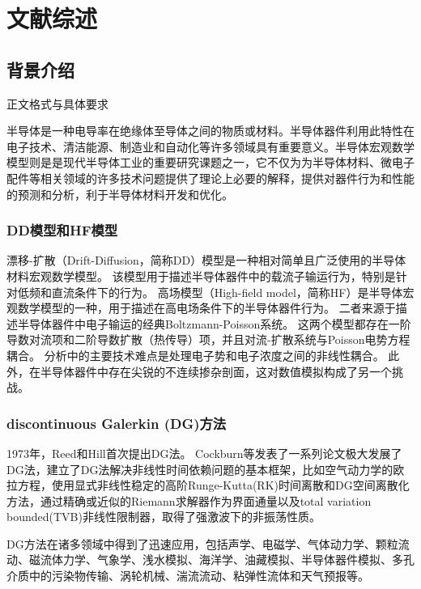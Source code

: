 \cleardoublepage
\newrefsection
\chapter{文献综述}

\section{背景介绍}
\par 正文格式与具体要求\cite{zjuthesisrules}

半导体是一种电导率在绝缘体至导体之间的物质或材料。半导体器件利用此特性在电子技术、清洁能源、制造业和自动化等许多领域具有重要意义。半导体宏观数学模型则是是现代半导体工业的重要研究课题之一，它不仅为为半导体材料、微电子配件等相关领域的许多技术问题提供了理论上必要的解释，提供对器件行为和性能的预测和分析，利于半导体材料开发和优化。
\subsection{DD模型\cite{cercignani2000device}和HF模型\cite{cercignani2000device}}
漂移-扩散（Drift-Diffusion，简称DD）模型是一种相对简单且广泛使用的半导体材料宏观数学模型。
该模型用于描述半导体器件中的载流子输运行为，特别是针对低频和直流条件下的行为。
高场模型（High-field model，简称HF）是半导体宏观数学模型的一种，用于描述在高电场条件下的半导体器件行为。
二者来源于描述半导体器件中电子输运的经典Boltzmann-Poisson系统。
这两个模型都存在一阶导数对流项和二阶导数扩散（热传导）项，并且对流-扩散系统与Poisson电势方程耦合\cite{cercignani2000device}。
分析中的主要技术难点是处理电子势和电子浓度之间的非线性耦合。
此外，在半导体器件中存在尖锐的不连续掺杂剖面，这对数值模拟构成了另一个挑战。

\subsection{discontinuous Galerkin (DG)方法}
1973年，Reed和Hill首次提出DG法\cite{reed1973triangular}。
Cockburn等发表了一系列论文极大发展了DG法，建立了DG法解决非线性时间依赖问题的基本框架\cite{reed1973triangular,cockburn1991runge,cockburn1989tvb2,cockburn1989tvb3,cockburn1990runge,cockburn1998runge}，比如空气动力学的欧拉方程，使用显式非线性稳定的高阶Runge-Kutta(RK)时间离散和DG空间离散化方法，通过精确或近似的Riemann求解器作为界面通量以及total variation bounded(TVB)非线性限制器，取得了强激波下的非振荡性质。

DG方法在诸多领域中得到了迅速应用，包括声学、电磁学、气体动力学、颗粒流动、磁流体力学、气象学、浅水模拟、海洋学、油藏模拟、半导体器件模拟、多孔介质中的污染物传输、涡轮机械、湍流流动、粘弹性流体和天气预报等\cite{cockburn2000development}。

